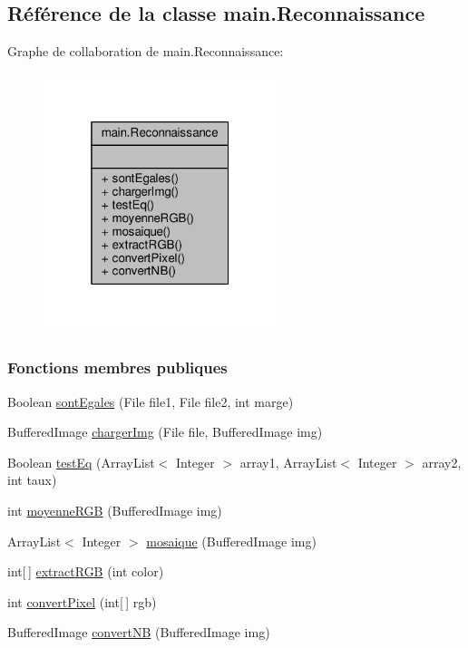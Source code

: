 \hypertarget{classmain_1_1Reconnaissance}{}\subsection{Référence de la classe main.\+Reconnaissance}
\label{classmain_1_1Reconnaissance}


Graphe de collaboration de main.\+Reconnaissance\+:\nopagebreak
\begin{figure}[H]
\begin{center}
\leavevmode
\includegraphics[width=193pt]{classmain_1_1Reconnaissance__coll__graph}
\end{center}
\end{figure}
\subsubsection*{Fonctions membres publiques}
\begin{DoxyCompactItemize}
\item 
Boolean \hyperlink{classmain_1_1Reconnaissance_a38c130443b982acb4b2845a08ab0f760}{sont\+Egales} (File file1, File file2, int marge)
\item 
Buffered\+Image \hyperlink{classmain_1_1Reconnaissance_a529007c6a57f40fe20d927a2ece42888}{charger\+Img} (File file, Buffered\+Image img)
\item 
Boolean \hyperlink{classmain_1_1Reconnaissance_ab0397a5a0d7617d6ef1224ff745577e7}{test\+Eq} (Array\+List$<$ Integer $>$ array1, Array\+List$<$ Integer $>$ array2, int taux)
\item 
int \hyperlink{classmain_1_1Reconnaissance_a6dbbddb9e0e8a7c73b99c4b3ba1abd5e}{moyenne\+R\+G\+B} (Buffered\+Image img)
\item 
Array\+List$<$ Integer $>$ \hyperlink{classmain_1_1Reconnaissance_aff8f24d9ee54fde25664c5457affd5fc}{mosaique} (Buffered\+Image img)
\item 
int\mbox{[}$\,$\mbox{]} \hyperlink{classmain_1_1Reconnaissance_ad168657e2ebc6cbcbf05c020323db76f}{extract\+R\+G\+B} (int color)
\item 
int \hyperlink{classmain_1_1Reconnaissance_a988c9b63788af42d17f301f9a98292c0}{convert\+Pixel} (int\mbox{[}$\,$\mbox{]} rgb)
\item 
Buffered\+Image \hyperlink{classmain_1_1Reconnaissance_a3de67a4640363862fbafefd2320dfd0c}{convert\+N\+B} (Buffered\+Image img)
\end{DoxyCompactItemize}


